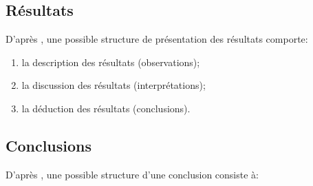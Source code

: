 \documentclass[11pt,a4paper,french]{article}
\begin{document}
\IMTAsommaire
\newpage
\IMTAlistefigures  %
\IMTAlistetableaux   %
\newpage
%








\subsection{Résultats}\label{sec:SS_STRU2}

D'après \cite{[Lichtfouse2012]}, une possible structure de présentation des résultats comporte:

\begin{enumerate}
	\item la description des résultats (observations);
	\item la discussion des résultats (interprétations);
	\item la déduction des résultats (conclusions).
\end{enumerate}

\subsection{Conclusions}\label{sec:SS_STRU3}

D'après \cite{[Lichtfouse2012]}, une possible structure d'une conclusion consiste à:
\end{document}

